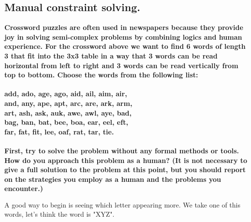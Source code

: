 \documentclass[paper=a4, fontsize=11pt]{scrartcl} %
\numberwithin{equation}{section} %
\numberwithin{figure}{section} %
\numberwithin{table}{section} %
\begin{document}
\subsection*{Manual constraint solving.}

\textbf{
Crossword puzzles are often used in newspapers because they provide joy in solving semi-complex problems by combining logics and human experience. For the crossword above we want to find 6 words of length 3 that fit into the 3x3 table in a way that 3 words can be read horizontal from left to right and 3 words can be read vertically from top to bottom. Choose the words from the following list:\\
\\
add, ado, age, ago, aid, ail, aim, air,\\
and, any, ape, apt, arc, are, ark, arm,\\
art, ash, ask, auk, awe, awl, aye, bad,\\
bag, ban, bat, bee, boa, ear, eel, eft,\\
far, fat, fit, lee, oaf, rat, tar, tie.\\
\\
First, try to solve the problem without any formal methods or tools. How do you approach this problem as a human? (It is not necessary to give a full solution to the problem at this point, but you should report on the strategies you employ as a human and the problems you encounter.)
}
\newpage

A good way to begin is seeing which letter appearing more. We take one of this words, let's think the word is "XYZ". \\
\end{document}
